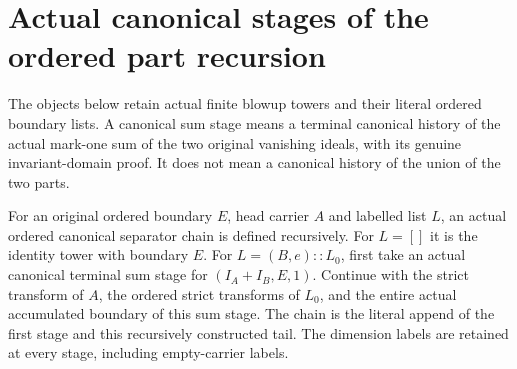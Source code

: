 \section{Actual canonical stages of the ordered part recursion}

The objects below retain actual finite blowup towers and their literal
ordered boundary lists. A canonical sum stage means a terminal canonical
history of the actual mark-one sum of the two original vanishing ideals,
with its genuine invariant-domain proof. It does not mean a canonical
history of the union of the two parts.

\begin{definition}
\label{hir:original-canonical-ordered-separator-chain}
\leanok
For an original ordered boundary $E$, head carrier $A$ and labelled
list $L$, an actual ordered canonical separator chain is defined
recursively. For $L=[]$ it is the identity tower with boundary $E$.
For $L=(B,e)::L_0$, first take an actual canonical terminal sum stage
for $(I_A+I_B,E,1)$. Continue with the strict transform of $A$, the
ordered strict transforms of $L_0$, and the entire actual accumulated
boundary of this sum stage. The chain is the literal append of the
first stage and this recursively constructed tail. The dimension
labels are retained at every stage, including empty-carrier labels.
\end{definition}

